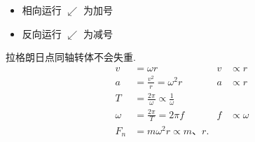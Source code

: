 \begin{itemize}
\item 相向运行 $\swarrow$ 为加号 %
\item 反向运行 $\swarrow$ 为减号 %
\end{itemize}
拉格朗日点\quad 同轴转体\quad 不会失重\quad {}.
\begin{align*}
v&=\omega r & v&\propto r\\
a&=\frac{v^2}{r}=\omega^2 r & a&\propto r\\
T&=\frac{2\pi}{\omega}\propto\frac{1}{\omega}\\
\omega&=\frac{2\pi}{T}=2\pi f & f&\propto\omega\\
F_n&=m\omega^2 r\propto m\text{、}r.
\end{align*}
